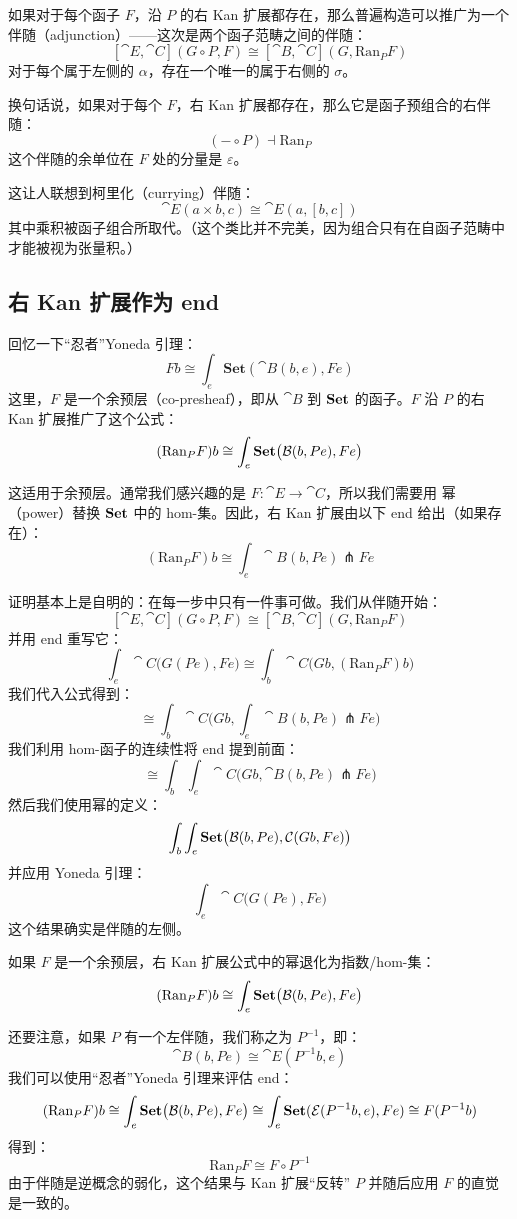 \documentclass[DaoFP]{subfiles}
\begin{document}
如果对于每个函子 $F$，沿 $P$ 的右 Kan 扩展都存在，那么普遍构造可以推广为一个伴随（adjunction）——这次是两个函子范畴之间的伴随：
\[ [\cat E, \cat C](G \circ P, F) \cong [\cat B, \cat C](G, \text{Ran}_P F) \]
对于每个属于左侧的 $\alpha$，存在一个唯一的属于右侧的 $\sigma$。

换句话说，如果对于每个 $F$，右 Kan 扩展都存在，那么它是函子预组合的右伴随：
\[ (- \circ P) \dashv \text{Ran}_P \]
这个伴随的余单位在 $F$ 处的分量是 $\varepsilon$。

这让人联想到柯里化（currying）伴随：
\[ \cat E (a \times b, c) \cong \cat E (a, [b, c]) \]
其中乘积被函子组合所取代。（这个类比并不完美，因为组合只有在自函子范畴中才能被视为张量积。）

\subsection{右 Kan 扩展作为 end}

回忆一下“忍者”Yoneda 引理：
\[ F b \cong \int_{e} \mathbf{Set} (\cat B(b, e), F e) \]
这里，$F$ 是一个余预层（co-presheaf），即从 $\cat B$ 到 $\mathbf{Set}$ 的函子。$F$ 沿 $P$ 的右 Kan 扩展推广了这个公式：
\[ (\text{Ran}_P F) b \cong \int_e \mathbf{Set} \big( \mathcal{B} (b, P e), F e\big) \]

这适用于余预层。通常我们感兴趣的是 $F \colon \cat E \to \cat C$，所以我们需要用 幂（power）替换 $\mathbf{Set}$ 中的 hom-集。因此，右 Kan 扩展由以下 end 给出（如果存在）：
 \[ (\text{Ran}_P F) b \cong \int_e \cat B (b, P e) \pitchfork F e \]
 
 证明基本上是自明的：在每一步中只有一件事可做。我们从伴随开始：
  \[ [\cat E, \cat C](G \circ P, F) \cong [\cat B, \cat C](G, \text{Ran}_P F) \]
并用 end 重写它：
 \[ \int_e \cat C \big(G ( P e), F e\big) \cong \int_b \cat C\big(G b, (\text{Ran}_P F) b\big) \]
我们代入公式得到：
 \[ \cong  \int_b \cat C\big(G b,\int_e \cat B (b, P e) \pitchfork F e \big)\]
我们利用 hom-函子的连续性将 end 提到前面：
\[  \cong  \int_b \int_e \cat C\big(G b, \cat B (b, P e) \pitchfork F e \big) \]
然后我们使用幂的定义：
\[ \int_b \int_e \mathbf{Set} \big(  \mathcal{B} (b, P e), \mathcal{C} (G b, F e) \big) \]
并应用 Yoneda 引理：
\[ \int_e  \cat C \big(G (P e), F e\big) \]
这个结果确实是伴随的左侧。
 
如果 $F$ 是一个余预层，右 Kan 扩展公式中的幂退化为指数/hom-集：
  \[ (\text{Ran}_P F) b \cong \int_e \mathbf{Set} \big( \mathcal{B} (b, P e), F e\big) \]
 
 还要注意，如果 $P$ 有一个左伴随，我们称之为 $P^{-1}$，即：
 \[ \cat B(b, P e) \cong \cat E(P^{-1} b, e) \]
 我们可以使用“忍者”Yoneda 引理来评估 end：
 \[ (\text{Ran}_P F) b \cong \int_e \mathbf{Set} \big( \mathcal{B} (b, P e), F e\big) \cong \int_e \mathbf{Set}(\mathcal{E}(P^{-1} b, e), F e) \cong F(P^{-1} b)\]
得到：
 \[  \text{Ran}_P F \cong F \circ P^{-1} \]
 由于伴随是逆概念的弱化，这个结果与 Kan 扩展“反转” $P$ 并随后应用 $F$ 的直觉是一致的。
 
\end{document}
